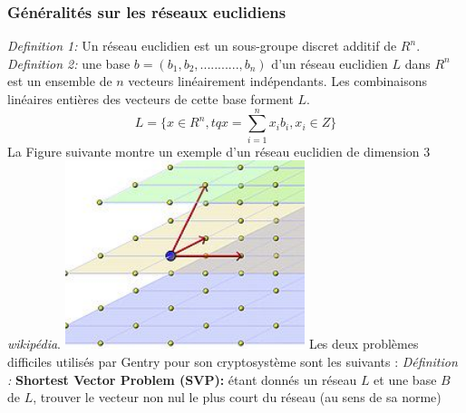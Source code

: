 \documentclass[a4paper,11pt]{report}
\begin{document}
\subsubsection{Généralités sur les réseaux euclidiens}
\textit{ Definition 1:} Un réseau euclidien est un sous-groupe discret additif de $R^n$.\newline
\newline
\textit{ Definition 2:} une base $b= (b_1,b_2,...........,b_n)$  d’un réseau euclidien $L$ dans $R^n$ est un ensemble de $n$ vecteurs 
linéairement indépendants. Les combinaisons linéaires entières des vecteurs de cette base forment $L$.
$$L = \{x\in R^n, tq x = \sum_{i=1}^{n} x_ib_i, x_i\in Z\}$$
La Figure suivante montre un exemple d'un réseau euclidien de dimension 3 \textit{wikipédia}.\newline
\newline
\newline    
\hspace*{5cm}{}\includegraphics[width=7cm]{reseau.jpg}
\newline
\newline
Les deux problèmes difficiles utilisés par Gentry pour son cryptosystème sont les suivants : \newline
\textit{Définition :} \textbf{Shortest Vector Problem (SVP):}\newline
étant donnés un réseau $L$ et une base $B$ de $L$, trouver le vecteur non nul le plus court du réseau (au sens de sa norme)\newline
\newline
\newline
\end{document}
